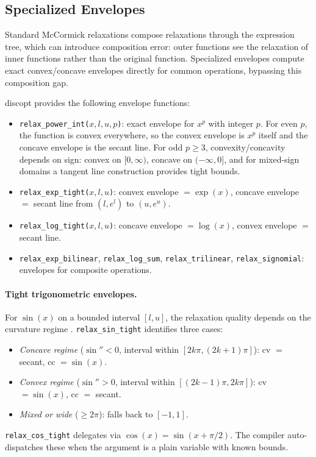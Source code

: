 \documentclass[12pt,preprint]{article}
\begin{document}
\subsection{Specialized Envelopes}
\label{org-specialized-envelopes}
Standard McCormick relaxations compose relaxations through the expression tree, which can introduce composition error: outer functions see the relaxation of inner functions rather than the original function. Specialized envelopes compute exact convex/concave envelopes directly for common operations, bypassing this composition gap.

discopt provides the following envelope functions:
\begin{itemize}
\item \texttt{relax\_power\_int($x, l, u, p$)}: exact envelope for $x^p$ with integer $p$. For even $p$, the function is convex everywhere, so the convex envelope is $x^p$ itself and the concave envelope is the secant line. For odd $p \ge 3$, convexity/concavity depends on sign: convex on $[0, \infty)$, concave on $(-\infty, 0]$, and for mixed-sign domains a tangent line construction provides tight bounds.
\item \texttt{relax\_exp\_tight($x, l, u$)}: convex envelope $= \exp(x)$, concave envelope $= $ secant line from $(l, e^l)$ to $(u, e^u)$.
\item \texttt{relax\_log\_tight($x, l, u$)}: concave envelope $= \log(x)$, convex envelope $= $ secant line.
\item \texttt{relax\_exp\_bilinear}, \texttt{relax\_log\_sum}, \texttt{relax\_trilinear}, \texttt{relax\_signomial}: envelopes for composite operations.
\end{itemize}

\paragraph{Tight trigonometric envelopes.}
For $\sin(x)$ on a bounded interval $[l, u]$, the relaxation quality depends on the curvature regime \cite{Locatelli2014}. \texttt{relax\_sin\_tight} identifies three cases:
\begin{itemize}
\item \emph{Concave regime} ($\sin'' < 0$, interval within $[2k\pi, (2k+1)\pi]$): cv $=$ secant, cc $= \sin(x)$.
\item \emph{Convex regime} ($\sin'' > 0$, interval within $[(2k-1)\pi, 2k\pi]$): cv $= \sin(x)$, cc $=$ secant.
\item \emph{Mixed or wide} ($\ge 2\pi$): falls back to $[-1, 1]$.
\end{itemize}
\texttt{relax\_cos\_tight} delegates via $\cos(x) = \sin(x + \pi/2)$. The compiler auto-dispatches these when the argument is a plain variable with known bounds.
\end{document}
